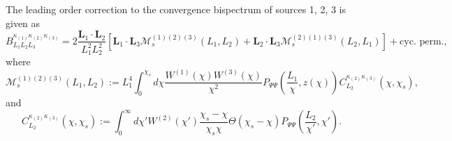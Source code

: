 \documentclass[11pt]{article} %
\begin{document}
The leading order correction to the convergence bispectrum of sources 1, 2, 3 is given as
\begin{equation}
    B^{\kappa_{(1)}\kappa_{(2)}\kappa_{(3)}}_{L_1 L_2 L_3} = 2\frac{\mathbf L_1\cdot\mathbf L_2}{L_1^2L_2^2}\left[ \mathbf L_1\cdot \mathbf L_3 \mathcal M_s^{(1)(2)(3)}(L_1,L_2)
 +\mathbf L_2\cdot \mathbf L_3 \mathcal M_s^{(2)(1)(3)}(L_2,L_1)\right] + \text{cyc. perm.},
\end{equation}
where
\begin{equation}
    \mathcal M_s^{(1)(2)(3)}(L_1,L_2) := L_1^4\int_0^{\chi_s}d\chi \frac{W^{(1)}(\chi)W^{(3)}(\chi)}{\chi^2} P_{\Psi\Psi}\left(\frac{L_1}{\chi}, z(\chi)\right) C_{L_2}^{\kappa_{(2)}\kappa_{(3)}}(\chi,\chi_s),
\end{equation}
and
\begin{equation}
    C_{L_2}^{\kappa_{(2)}\kappa_{(3)}}(\chi,\chi_s) := \int_0^{\infty}d \chi' W^{(2)}(\chi')\frac{\chi_s-\chi}{\chi_s\chi}\Theta(\chi_s-\chi)P_{\Psi\Psi}(\frac{L_2}{\chi'},\chi').
\end{equation}
 
\end{document}
